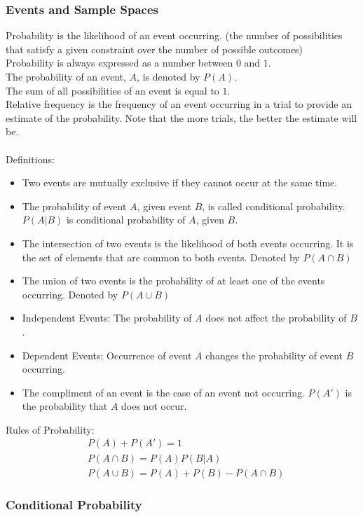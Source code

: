 \subsubsection{Events and Sample Spaces}
Probability is the likelihood of an event occurring. (the number of possibilities that satisfy a given constraint over the number of possible outcomes)\\
Probability is always expressed as a number between $0$ and $1$.\\
The probability of an event, $A$, is denoted by $P(A)$.\\
The sum of all possibilities of an event is equal to $1$.\\
Relative frequency is the frequency of an event occurring in a trial to provide an estimate of the probability. Note that the more trials, the better the estimate will be.\\
\\
Definitions:
\begin{itemize}
    \item Two events are mutually exclusive if they cannot occur at the same time.
    \item The probability of event $A$, given event $B$, is called conditional probability. $P(A|B)$ is conditional probability of $A$, given $B$.
    \item The intersection of two events is the likelihood of both events occurring. It is the set of elements that are common to both events. Denoted by $P(A\cap B)$
    \item The union of two events is the probability of at least one of the events occurring. Denoted by $P(A\cup B)$
    \item Independent Events: The probability of $A$ does not affect the probability of $B$.
    \item Dependent Events: Occurrence of event $A$ changes the probability of event $B$ occurring.
    \item The compliment of an event is the case of an event not occurring. $P(A')$ is the probability that $A$ does not occur.
\end{itemize}
Rules of Probability:
\begin{align*}
    &P(A)+P(A')=1\\
    &P(A\cap B)=P(A)P(B|A)\\
    &P(A\cup B)=P(A)+P(B)-P(A\cap B)
\end{align*}
\subsubsection{Conditional Probability}
